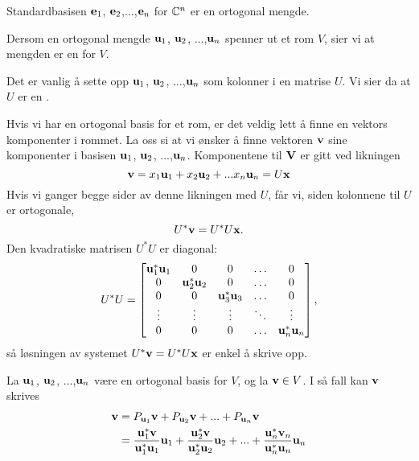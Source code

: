 \begin{ex}
Standardbasisen $\mathbf{e}_1$, $\mathbf{e}_2$,...,$\mathbf{e}_n$ for $\mathbb{C}^n$ er en ortogonal mengde.
\end{ex}

\begin{defnx}
Dersom en ortogonal mengde $\mathbf{u}_1$, $\mathbf{u} _2$, ...,$\mathbf{u}_n$ spenner ut et rom $V$, sier vi at mengden er en  for $V$.
\end{defnx}
Det er vanlig å sette opp $\mathbf{u}_1$, $\mathbf{u} _2$, ...,$\mathbf{u}_n$ som kolonner i en matrise $U$. Vi sier da at $U$ er en .
%
%

Hvis vi har en ortogonal basis for et rom, er det veldig lett å finne en vektors komponenter i rommet. La oss si at vi ønsker å finne vektoren $\mathbf{v}$ sine komponenter i basisen $\mathbf{u}_1$, $\mathbf{u} _2$, ...,$\mathbf{u}_n$. Komponentene til $\mathbf{V}$ er gitt ved likningen 
\[
\mathbf{v} = x_1 \mathbf{u}_1 + x_2 \mathbf{u}_2 + ...x_n \mathbf{u}_n = U\mathbf{x}
\]
Hvis vi ganger begge sider av denne likningen med $U$, får vi, siden kolonnene til $U$ er ortogonale,
\[
U^* \mathbf{v} = U^*U\mathbf{x}.
\]
Den kvadratiske matrisen $U^*U$ er diagonal:
\[
U^*U=
\begin{bmatrix}
\mathbf{u}_1^*\mathbf{u}_1 & 0 & 0 & \hdots & 0 \\
0 & \mathbf{u}_2^*\mathbf{u}_2 & 0 & \hdots & 0 \\
0 & 0 & \mathbf{u}_3^*\mathbf{u}_3  & \hdots & 0 \\
\vdots & \vdots & \vdots & \ddots & \vdots\\
0 & 0 & 0 & \hdots & \mathbf{u}_n^*\mathbf{u}_n
\end{bmatrix},
\]
så løsningen av systemet $U^* \mathbf{v} = U^*U\mathbf{x}$ er enkel å skrive opp. 
\begin{thm}
La $\mathbf{u}_1$, $\mathbf{u} _2$, ...,$\mathbf{u}_n$ være en ortogonal basis for $V$, og la $\mathbf{v} \in V$. I så fall kan $\mathbf{v}$ skrives
\begin{align*}
\mathbf{v}&= P_{\mathbf{u}_1} \mathbf{v} + P_{\mathbf{u}_2} \mathbf{v} + ... +P_{\mathbf{u}_n} \mathbf{v}\\ &= \frac{\mathbf{u}_1^*\mathbf{v}}{\mathbf{u}_1^*\mathbf{u}_1}\mathbf{u}_1 + \frac{\mathbf{u}_2^*\mathbf{v}}{\mathbf{u}_2^*\mathbf{u}_2}\mathbf{u}_2+...+\frac{\mathbf{u}_n^*\mathbf{v}_n}{\mathbf{u}_n^*\mathbf{u}_n}\mathbf{u}_n
\end{align*}
\end{thm}

